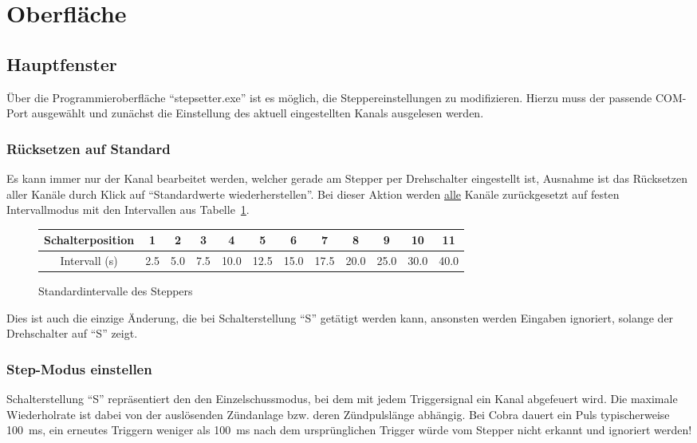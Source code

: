\documentclass[paper=a4, open=any, numbers=noenddot]{scrbook}
\begin{document}
		\section{Oberfläche}
			\subsection{Hauptfenster}
				Über die Programmieroberfläche \enquote{stepsetter.exe} ist es möglich, die Steppereinstellungen zu modifizieren. Hierzu muss der passende COM-Port ausgewählt und zunächst die Einstellung des aktuell eingestellten Kanals ausgelesen werden.

				\subsubsection*{Rücksetzen auf Standard}
					Es kann immer nur der Kanal bearbeitet werden, welcher gerade am Stepper per Drehschalter eingestellt ist, Ausnahme ist das Rücksetzen aller Kanäle durch Klick auf \enquote{Standardwerte wiederherstellen}. Bei dieser Aktion werden \underline{alle} Kanäle zurückgesetzt auf festen Intervallmodus mit den Intervallen aus Tabelle~\ref{tab:standardintervalle}.

					\begin{figure}
						\begin{center}
							\begin{longtabu}
								[c]{c|*{11}c}
								Schalterposition & 1   & 2   & 3   & 4    & 5    & 6    & 7    & 8    & 9    & 10   & 11   \\ \hline
								Intervall (s)    & 2.5 & 5.0 & 7.5 & 10.0 & 12.5 & 15.0 & 17.5 & 20.0 & 25.0 & 30.0 & 40.0
							\end{longtabu}
						\end{center}
						\caption{Standardintervalle des Steppers}
						\label{tab:standardintervalle}
					\end{figure}

					Dies ist auch die einzige Änderung, die bei Schalterstellung \enquote{S} getätigt werden kann, ansonsten werden Eingaben ignoriert, solange der Drehschalter auf \enquote{S} zeigt.

				\subsubsection*{Step-Modus einstellen}

					Schalterstellung \enquote{S} repräsentiert den den Einzelschussmodus, bei dem mit jedem Triggersignal ein Kanal abgefeuert wird. Die maximale Wiederholrate ist dabei von der auslösenden Zündanlage bzw. deren Zündpulslänge abhängig. Bei Cobra dauert ein Puls typischerweise \SI{100}{\milli\second}, ein erneutes Triggern weniger als \SI{100}{\milli\second} nach dem ursprünglichen Trigger würde vom Stepper nicht erkannt und ignoriert werden!
\end{document}
